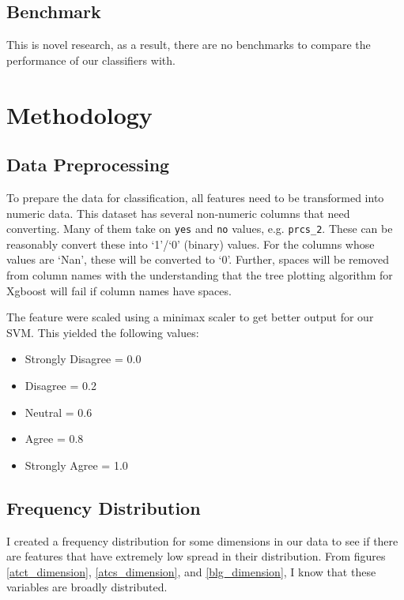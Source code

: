 \section*{Benchmark}

This is novel research, as a result, there are no benchmarks to compare the performance of our classifiers with.


\chapter*{Methodology}


\section*{Data Preprocessing}

To prepare the data for classification, all features need to be transformed into numeric data. This dataset has several non-numeric columns that need converting. Many of them take on \texttt{yes} and \texttt{no} values, e.g. \texttt{prcs\_2}. These can be reasonably convert these into `1'/`0' (binary) values. For the columns whose values are `Nan', these will be converted to `0'. Further, spaces will be removed from column names with the understanding that the tree plotting algorithm for Xgboost will fail if column names have spaces. 

The feature were scaled using a minimax scaler to get better output for our SVM. This yielded the following values:
\begin {itemize}
\item Strongly Disagree = 0.0
\item Disagree = 0.2
\item Neutral = 0.6
\item Agree = 0.8
\item Strongly Agree = 1.0
\end{itemize} 



\section*{Frequency Distribution}
I created a frequency distribution for some dimensions in our data to see if there are features that have extremely low spread in their distribution. From figures \ref{atct_dimension}, \ref{atcs_dimension}, and \ref{blg_dimension}, I know that these variables are broadly distributed.

